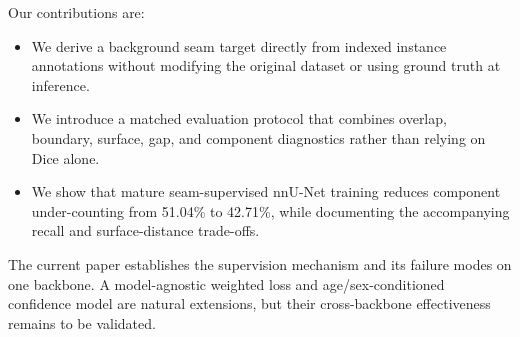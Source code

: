 Our contributions are:
\begin{itemize}
    \item We derive a background seam target directly from indexed instance annotations without modifying the original dataset or using ground truth at inference.
    \item We introduce a matched evaluation protocol that combines overlap, boundary, surface, gap, and component diagnostics rather than relying on Dice alone.
    \item We show that mature seam-supervised nnU-Net training reduces component under-counting from 51.04\% to 42.71\%, while documenting the accompanying recall and surface-distance trade-offs.
\end{itemize}

The current paper establishes the supervision mechanism and its failure modes on one backbone. A model-agnostic weighted loss and age/sex-conditioned confidence model are natural extensions, but their cross-backbone effectiveness remains to be validated.
